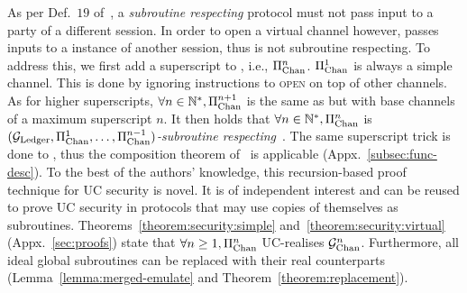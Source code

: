   As per Def.~$19$ of~\cite{cryptoeprint:2000/067}, a
  \emph{subroutine respecting} protocol must not pass input to a party of a
  different session. In order to open a
  virtual channel however, \pchan
  passes inputs to a \pchan instance of another session, thus
  \pchan is not subroutine respecting. To
  address this, we first add a superscript to \pchan, i.e.,
  $\Pi_{\mathrm{Chan}}^{n}$. $\Pi_{\mathrm{Chan}}^{1}$ is always a simple channel.
  This is done by ignoring instructions to \textsc{open} on top of other
  channels. As for higher superscripts, $\forall n \in
  \mathbb{N}^*, \Pi_{\mathrm{Chan}}^{n+1}$ is the same as \pchan but with
  base channels of a maximum superscript $n$. It then holds that $\forall
  n \in \mathbb{N}^*, \Pi_{\mathrm{Chan}}^{n}$ is \emph{$(\mathcal{G}_{\mathrm{Ledger}}, \Pi_{\mathrm{Chan}}^{1}, \dots,
  \Pi_{\mathrm{Chan}}^{n-1})$-subroutine
  respecting}~\cite{DBLP:conf/tcc/BadertscherCHTZ20}. The same superscript
  trick is done to \fchan, thus the composition theorem
  of~\cite{DBLP:conf/tcc/BadertscherCHTZ20} is applicable
  (Appx.~\ref{subsec:func-desc}). To
  the best of the authors' knowledge, this recursion-based proof technique for
  UC security is novel. It is of independent interest and can be reused to prove
  UC security in protocols that may use copies of themselves as subroutines.
  Theorems~\ref{theorem:security:simple} and~\ref{theorem:security:virtual}
  (Appx.~\ref{sec:proofs}) state
  that $\forall n \geq 1, \Pi_{\mathrm{Chan}}^{n}$ UC-realises $\mathcal{G}_{\mathrm{Chan}}^{n}$. Furthermore,
  all ideal global subroutines can be replaced with their real counterparts
  (Lemma~\ref{lemma:merged-emulate} and Theorem~\ref{theorem:replacement}).
